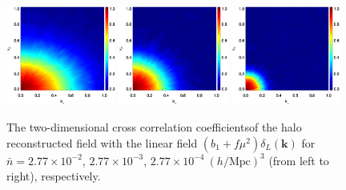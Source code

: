 \documentclass[aps,prd,twocolumn,superscriptaddress,groupedaddress,nofootinbib,amsfont]{revtex4}  %
\newcommand{\mr}{\mathrm}
\newcommand{\bmk}{\bm{k}}
\begin{document}
\begin{figure}[tbp]
\vspace{-0.3cm}
\begin{center}
\includegraphics[width=0.32\textwidth]{0.000anixcc_deltaRsxLs-0_31.eps}
\includegraphics[width=0.32\textwidth]{0.000anixcc_deltaRsxLs-1_31.eps}
\includegraphics[width=0.32\textwidth]{0.000anixcc_deltaRsxLs-2_31.eps}
\end{center}
\vspace{-0.7cm}
\caption{The two-dimensional cross correlation coefficientsof the halo 
reconstructed field with the linear field $(b_1+f\mu^2)\delta_L(\bmk)$ for
$\bar{n}=2.77\times10^{-2}$, $2.77\times10^{-3}$, $2.77\times10^{-4}\ (h/\mr{Mpc})^3$ (from left to right), respectively.}
\label{fig:xcc_ha}
\end{figure}



\end{document}
